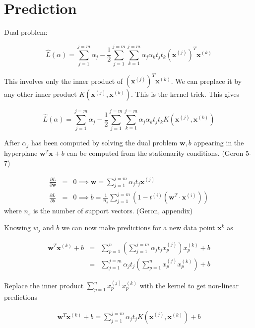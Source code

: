 \documentclass{article}
\newcommand{\beq}{\begin{equation}}
\newcommand{\eeq}{\end{equation}}
\newcommand{\ber}{\begin{eqnarray}}
\newcommand{\eer}{\end{eqnarray}}
\newcommand{\pdd}[2]{\frac{\partial{#1}}{\partial{#2}}}
\begin{document}
\section{Prediction}

Dual problem:

\beq
\hat{L}(\alpha) = \sum_{j=1}^{j=m}\alpha_j - \frac{1}{2}\sum_{j=1}^{j=m}\sum_{k=1}^{j=m}\alpha_j\alpha_kt_jt_k(\pmb{x}^{(j)})^T\pmb{x}^{(k)}
\eeq

This involves only the inner product of $(\pmb{x}^{(j)})^T\pmb{x}^{(k)}$. We can preplace it by any other inner product $K(\pmb{x}^{(j)},\pmb{x}^{(k)})$. This is the kernel trick. This gives

\beq
\hat{L}(\alpha) = \sum_{j=1}^{j=m}\alpha_j - \frac{1}{2}\sum_{j=1}^{j=m}\sum_{k=1}^{j=m}\alpha_j\alpha_kt_jt_kK(\pmb{x}^{(j)},\pmb{x}^{(k)})
\eeq

After $\alpha_j$ has been computed by solving the dual problem $\pmb{w},b$ appearing in the hyperplane $\pmb{w}^{T}\pmb{x} + b$ can be computed from the stationarity conditions.
(Geron 5-7)

\ber
\pdd{L}{\pmb{w}} &=& 0 \implies \pmb{w} = \sum_{j=1}^{j=m} \alpha_j t_j \pmb{x}^{(j)} \\
\pdd{L}{b}  &=& 0 \implies b = \frac{1}{n_s}\sum_{j=1}^{j=m} (1-t^{(i)}(\pmb{w}^T\cdot\pmb{x}^{(i)}))
\eer
where $n_s$ is the number of support vectors. (Geron, appendix)

Knowing $w_j$ and $b$ we can now make predictions for a new data point $\pmb{x}^{k}$ as 

\ber
\pmb{w}^T{\pmb{x}^{(k)}} + b &=& \sum_{p=1}^{n}(\sum_{j=1}^{j=m} \alpha_j t_j x_p^{(j)})x^{(k)}_{p} + b \\
&=& \sum_{j=1}^{j=m}  \alpha_j t_j ( \sum_{p=1}^{n}x_p^{(j)}x^{(k)}_{p}) + b
\eer

Replace the inner product $\sum_{p=1}^{n}x_p^{(j)}x^{(k)}_{p}$ with the kernel to get non-linear predictions

\ber
\pmb{w}^T{\pmb{x}^{(k)}} + b = \sum_{j=1}^{j=m}  \alpha_j t_j K(\pmb{x}^{(j)},\pmb{x}^{(k)}) + b
\eer
\end{document}
